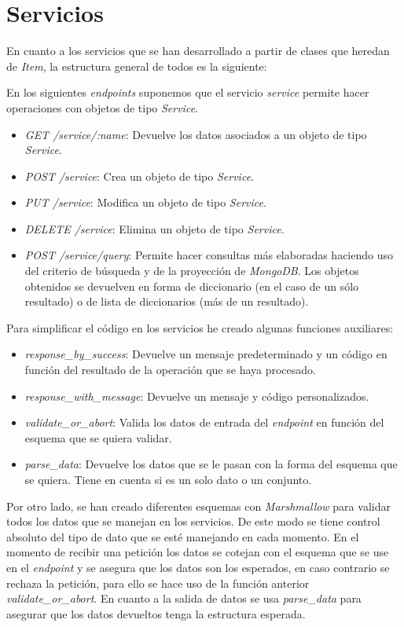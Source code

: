 \section{Servicios}
\label{sec:servicios}


En cuanto a los servicios que se han desarrollado a partir de clases que heredan de \textit{Item}, la estructura general de todos es la siguiente:

{\scriptsize En los siguientes \textit{endpoints} suponemos que el servicio \textit{service} permite hacer operaciones con objetos de tipo \textit{Service}.}

\begin{itemize}
	\item \textit{GET /service/:name}: Devuelve los datos asociados a un objeto de tipo \textit{Service}.
	\item \textit{POST /service}: Crea un objeto de tipo \textit{Service}.
	\item \textit{PUT /service}: Modifica un objeto de tipo \textit{Service}.
	\item \textit{DELETE /service}: Elimina un objeto de tipo \textit{Service}.
	\item \textit{POST /service/query}: Permite hacer consultas más elaboradas haciendo uso del criterio de búsqueda y de la proyección de \textit{MongoDB}. Los objetos obtenidos se devuelven en forma de diccionario (en el caso de un sólo resultado) o de lista de diccionarios (más de un resultado).
\end{itemize}


\bigskip
Para simplificar el código en los servicios he creado algunas funciones auxiliares:
\begin{itemize}
	\item \textit{response\_by\_success}: Devuelve un mensaje predeterminado y un código en función del resultado de la operación que se haya procesado.
	\item \textit{response\_with\_message}: Devuelve un mensaje y código personalizados.
	\item \textit{validate\_or\_abort}: Valida los datos de entrada del \textit{endpoint} en función del esquema que se quiera validar.
	\item \textit{parse\_data}: Devuelve los datos que se le pasan con la forma del esquema que se quiera. Tiene en cuenta si es un solo dato o un conjunto.
\end{itemize}


\bigskip
Por otro lado, se han creado diferentes esquemas con \textit{Marshmallow} para validar todos los datos que se manejan en los servicios. De este modo se tiene control absoluto del tipo de dato que se esté manejando en cada momento. En el momento de recibir una petición los datos se cotejan con el esquema que se use en el \textit{endpoint} y se asegura que los datos son los esperados, en caso contrario se rechaza la petición, para ello se hace uso de la función anterior \textit{validate\_or\_abort}. En cuanto a la salida de datos se usa \textit{parse\_data} para asegurar que los datos devueltos tenga la estructura esperada.


